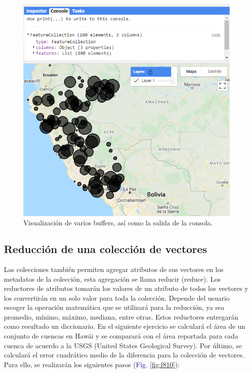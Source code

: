 \documentclass[
  12pt,
  letterpaper,
  twoside]{book}
\begin{document}
\begin{figure}[H]

{\centering \includegraphics[width=0.95\linewidth]{Img/ej21} 

}

\caption{Visualización de varios buffers, así como la salida de la consola.}\label{fig:f89}
\end{figure}

\hypertarget{reducciuxf3n-de-una-colecciuxf3n-de-vectores}{%
\subsection*{Reducción de una colección de vectores}\label{reducciuxf3n-de-una-colecciuxf3n-de-vectores}}

Las colecciones también permiten agregar atributos de sus vectores en los metadatos de la colección, esta agregación se llama reducir (reduce). Los reductores de atributos tomarán los valores de un atributo de todos los vectores y los convertirán en un solo valor para toda la colección. Depende del usuario escoger la operación matemática que se utilizará para la reducción, ya sea promedio, mínimo, máximo, mediana, entre otras. Estos reductores entregarán como resultado un diccionario. En el siguiente ejercicio se calculará el área de un conjunto de cuencas en Hawái y se comparará con el área reportada para cada cuenca de acuerdo a la USGS (United States Geological Survey). Por último, se calculará el error cuadrático medio de la diferencia para la colección de vectores. Para ello, se realizarán los siguientes pasos (\textcolor{darkblue}{Fig.} \ref{fig:f810}):
\end{document}
